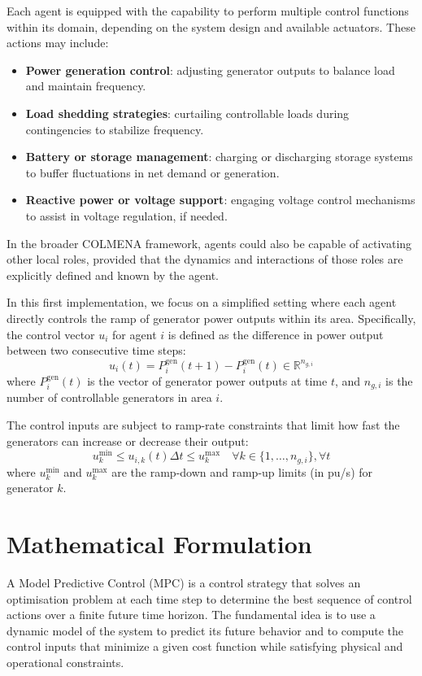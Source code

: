 \documentclass{article}
\begin{document}
Each agent is equipped with the capability to perform multiple control functions within its domain, depending on the system design and available actuators. These actions may include:
\begin{itemize}
    \item \textbf{Power generation control}: adjusting generator outputs to balance load and maintain frequency.
    \item \textbf{Load shedding strategies}: curtailing controllable loads during contingencies to stabilize frequency.
    \item \textbf{Battery or storage management}: charging or discharging storage systems to buffer fluctuations in net demand or generation.
    \item \textbf{Reactive power or voltage support}: engaging voltage control mechanisms to assist in voltage regulation, if needed.
\end{itemize}

In the broader COLMENA framework, agents could also be capable of activating other local roles, provided that the dynamics and interactions of those roles are explicitly defined and known by the agent.

In this first implementation, we focus on a simplified setting where each agent directly controls the ramp of generator power outputs within its area. Specifically, the control vector \( u_i \) for agent \( i \) is defined as the difference in power output between two consecutive time steps:
\begin{equation}
    u_i(t) = P^{\text{gen}}_i(t+1) - P^{\text{gen}}_i(t) \in \mathbb{R}^{n_{g,i}}
\end{equation}
where \( P^{\text{gen}}_i(t) \) is the vector of generator power outputs at time \( t \), and \( n_{g,i} \) is the number of controllable generators in area \( i \).

The control inputs are subject to ramp-rate constraints that limit how fast the generators can increase or decrease their output:
\begin{equation}
    u^{\min}_{k} \leq u_{i,k}(t)  \Delta  t \leq u^{\max}_{k} \quad \forall k \in \{1, \dots, n_{g,i}\}, \forall t
\end{equation}
where \( u^{\min}_{k} \) and \( u^{\max}_{k} \) are the ramp-down and ramp-up limits (in pu/s) for generator \( k \). 

\newpage
\section{Mathematical Formulation}
A Model Predictive Control (MPC) is a control strategy that solves an optimisation problem at each time step to determine the best sequence of control actions over a finite future time horizon. The fundamental idea is to use a dynamic model of the system to predict its future behavior and to compute the control inputs that minimize a given cost function while satisfying physical and operational constraints.
\end{document}
